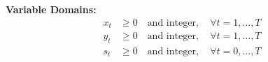 \documentclass{article}
\begin{document}
\textbf{Variable Domains:}
\begin{align}
    x_t &\geq 0 \quad \text{and integer}, \quad \forall t = 1, \ldots, T \\
    y_t &\geq 0 \quad \text{and integer}, \quad \forall t = 1, \ldots, T \\
    s_t &\geq 0 \quad \text{and integer}, \quad \forall t = 0, \ldots, T
\end{align}
\end{document}
